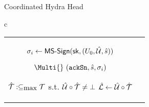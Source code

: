 \begin{figure*}[t!]
\begin{algobox}{Coordinated Hydra Head}
\begin{tabular}{c}
\begin{tabular}{c@{}c}
{\begin{walgo}{0.65}
{{               %
               $\sigma_i \gets \mathsf{MS\textsf{-}{}Sign}(\mathsf{sk}, (U_{0}, \hat {\mathcal U}, \hat s))$ \; %
 
               $\Multi{}~(\hpAS,\hats,\msSig_i)$ %

                 $\hat {\mathcal T} :\subseteq_{\mbox{max}} {\mathcal T}$ s.t. $\hat {\mathcal U}\circ\hat {\mathcal T}\not=\bot$ \; %
                 $\hat {\mathcal L} \gets \hat {\mathcal U}\circ\hat {\mathcal T}$
            }
           }
          
        \end{walgo}
        }
        &

        \adjustbox{valign=t,scale=\sfact}{
        \begin{walgo}{0.6}
          \On{$(\hpAS,s,\msSig_j)$ from $\party_j$}{ %

            \Req{} $s \in \{\hats,\hats+1\} ~ \land ~ (j,\msSig_j) \notin \Sigma$
            \; %

            \Wait{$\hats=s$
            }{ %
            

            $\Sigma \gets \Sigma \cup (j,\msSig_j)$ \; %

            \If{$\forall k \in [1..n]: (k,\cdot) \in \Sigma$}{ %
              $\msCSig \gets \msComb(\msVKL, \Sigma)$ \; %

              \Req{} $\msVfy(\msCVK, (\Uinit, \hatmU, \hats), \msCSig)$ \;
              $\bars \gets \hats$ \; %
              $\barmU \gets (\hatmU, \bars, \msCSig)$ \; %



              \If{$\hats = \bars \land \hpLdr(\bars + 1) = i \land \hatmT \neq \emptyset$}{%
                \Multi{} $(\hpRS,\bars+1,\hatmT\hpProjH)$ \;%
              }
            }
          } }
        \end{walgo}

          }

      \end{tabular}

      \\
      \\


\end{tabular}
\end{algobox}
\end{figure*}
